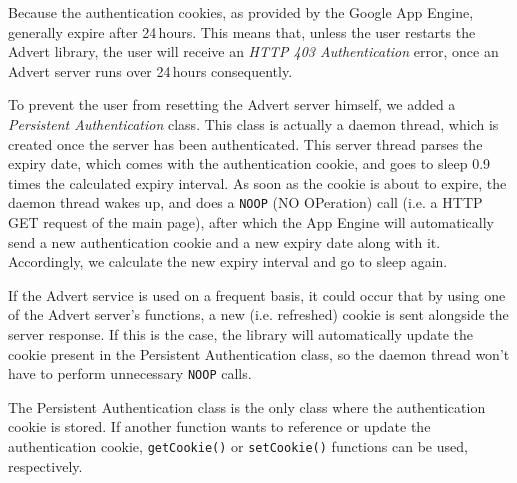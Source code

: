 Because the authentication cookies, as provided by the Google App Engine,
generally expire after 24\,hours. This means that, unless the user restarts the
Advert library, the user will receive an \emph{HTTP 403 Authentication} error,
once an Advert server runs over 24\,hours consequently. 

To prevent the user from resetting the Advert server himself, we added a
\emph{Persistent Authentication} class. This class is actually a daemon thread,
which is created once the server has been authenticated. This server thread
parses the expiry date, which comes with the authentication cookie, and goes to
sleep 0.9 times the calculated expiry interval. As soon as the cookie is about
to expire, the daemon thread wakes up, and does a \texttt{NOOP} (NO OPeration)
call (i.e. a HTTP GET request of the main page), after which the App Engine
will automatically send a new authentication cookie and a new expiry date along
with it. Accordingly, we calculate the new expiry interval and go to sleep
again.

If the Advert service is used on a frequent basis, it could occur that by using
one of the Advert server's functions, a new (i.e. refreshed) cookie is sent
alongside the server response. If this is the case, the library will
automatically update the cookie present in the Persistent Authentication class,
so the daemon thread won't have to perform unnecessary \texttt{NOOP} calls.

The Persistent Authentication class is the only class where the authentication
cookie is stored. If another function wants to reference or update the
authentication cookie, \texttt{getCookie()} or \texttt{setCookie()} functions
can be used, respectively.

